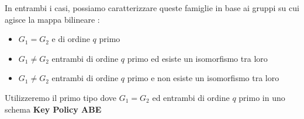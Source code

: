 In entrambi i casi, possiamo caratterizzare \cite{maya3} queste famiglie in base ai gruppi su cui agisce la mappa bilineare :
\begin{itemize}
	\item $G_1 = G_2$ e di ordine $q$ primo
	\item $G_1 \neq G_2$ entrambi di ordine $q$ primo ed esiste un isomorfismo tra loro
	\item $G_1 \neq G_2$ entrambi di ordine $q$ primo e non esiste un isomorfismo tra loro
\end{itemize}	

Utilizzeremo il primo tipo dove $G_1 = G_2$ ed entrambi di ordine $q$ primo in uno schema \textbf{Key Policy ABE}

\newpage

\newpage

\newpage


